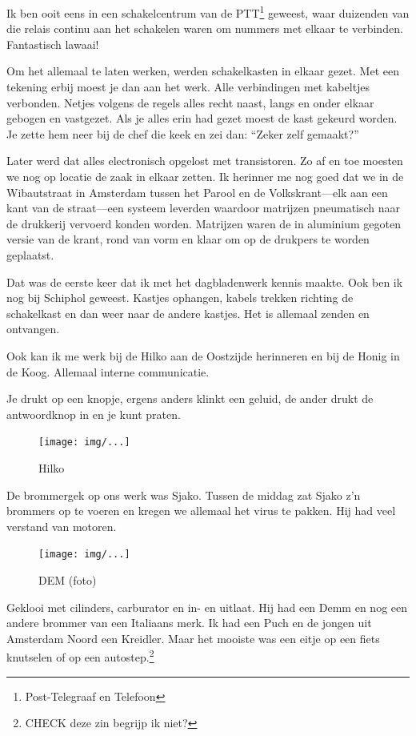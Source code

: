 \documentclass[12pt,twoside]{memoir}
\begin{document}
Ik ben ooit eens in een schakelcentrum van de PTT\footnote{Post-Telegraaf en Telefoon} geweest, waar duizenden van die relais continu aan het schakelen waren om nummers met elkaar te verbinden. Fantastisch lawaai! 

Om het allemaal te laten werken, werden schakelkasten in elkaar gezet. Met een tekening erbij moest je dan aan het werk. Alle verbindingen met kabeltjes verbonden. Netjes volgens de regels alles recht naast, langs en onder elkaar gebogen en vastgezet. Als je alles erin had gezet moest de kast gekeurd worden. Je zette hem neer bij de chef die keek en zei dan: ``Zeker zelf gemaakt?''

Later werd dat alles electronisch opgelost met transistoren. Zo af en toe moesten we nog op locatie de zaak in elkaar zetten. Ik herinner me nog goed dat we in de Wibautstraat in Amsterdam tussen het Parool en de Volkskrant---elk aan een kant van de straat---een systeem leverden waardoor matrijzen pneumatisch naar de drukkerij vervoerd konden worden. Matrijzen waren de in aluminium gegoten versie van de krant, rond van vorm en klaar om op de drukpers te worden geplaatst. 

Dat was de eerste keer dat ik met het dagbladenwerk kennis maakte. Ook ben ik nog bij Schiphol geweest. Kastjes ophangen, kabels trekken richting de schakelkast en dan weer naar de andere kastjes. Het is allemaal zenden en ontvangen. 

Ook kan ik me werk bij de Hilko aan de Oostzijde herinneren en bij de Honig in de Koog. Allemaal interne communicatie. 

Je drukt op een knopje, ergens anders klinkt een geluid, de ander drukt de antwoordknop in en je kunt praten.	

\begin{figure}[t]
\texttt{[image: img/...]}
\caption{Hilko}
\end{figure}

De brommergek op ons werk was Sjako. Tussen de middag zat Sjako z'n brommers op te voeren en kregen we allemaal het virus te pakken. Hij had veel verstand van motoren. 

\begin{figure}[t]
\texttt{[image: img/...]}
\caption{DEM (foto)}
\end{figure}

Geklooi met cilinders, carburator en in- en uitlaat. Hij had een Demm en nog een andere brommer van een Italiaans merk. Ik had een Puch en de jongen uit Amsterdam Noord een Kreidler. Maar het mooiste was een eitje op een fiets knutselen of op een autostep.\footnote{CHECK deze zin begrijp ik niet?}
\end{document}

